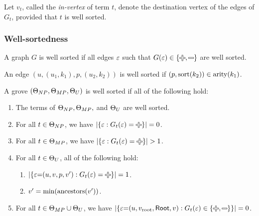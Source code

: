 Let $v_t$, called the \emph{in-vertex} of term $t$,
denote the destination vertex of the edges of $G_t$,
provided that $t$ is well sorted.


\subsubsection{Well-sortedness}

\begin{definition}
  A graph $G$ is well sorted if all edges $\e$ such that $G(\e) \in \{\Plus, \Minus\}$ are well sorted.
\end{definition}

\begin{definition}
  An edge $(u, (u_1, k_1), p, (u_2, k_2))$ is well sorted if $(p, \sort{k_2}) \in \arity{k_1}$.
\end{definition}

\begin{definition}
  A grove $(\Set[NP], \Set[MP], \Set[U])$ is well sorted if all of the following hold:
  \begin{enumerate}
    \item The terms of $\Set[NP], \Set[MP],$ and $\Set[U]$ are well sorted.
    \item For all $t \in \Set[NP]$,
      we have $\SizeOf{\SetOf{\e \SuchThat{G_t(\e) = \Plus}}} = 0$.
    \item For all $t \in \Set[MP]$,
      we have $\SizeOf{\SetOf{\e \SuchThat{G_t(\e) = \Plus}}} > 1$.
    \item For all $t \in \Set[U]$, all of the following hold:
      \begin{enumerate}
        \item $\SizeOf{\SetOf{\e{=}(u, v, p, v') \SuchThat{G_t(\e) = \Plus}}} = 1$.
        \item $v' = \min{\ancestors{v'}}$.
      \end{enumerate}
    \item For all $t \in \Set[MP] \cup \Set[U]$,
      we have $\SizeOf{\SetOf{\e{=}(u, \rootVertex, \Root, v) \SuchThat{G_t(\e) \in \SetOf{\Plus, \Minus}}}} = 0$.
  \end{enumerate}
\end{definition}

